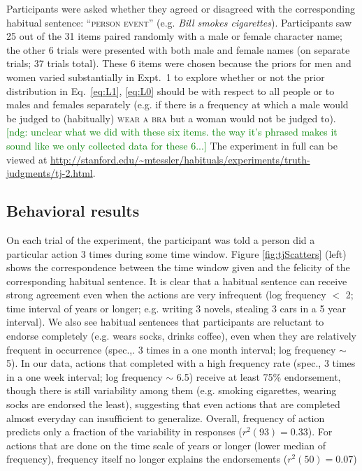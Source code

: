 \documentclass[10pt,letterpaper]{article}
\newcommand{\ndg}[1]{\textcolor{Green}{[ndg: #1]}}
\begin{document}
Participants were asked whether they agreed or disagreed with the corresponding habitual sentence: ``\textsc{person event}'' (e.g. \emph{Bill smokes cigarettes}).
Participants saw 25 out of the 31 items paired randomly with a male or female character name; the other 6 trials were presented with both male and female names (on separate trials; 37 trials total).  
These 6 items were chosen because the priors for men and women varied substantially in Expt.~1 to explore whether or not the prior distribution in Eq.~\ref{eq:L1}, \ref{eq:L0} should be with respect to all people or to males and females separately (e.g. if there is a frequency at which a male would be judged to (habitually) \textsc{wear a bra} but a woman would not be judged to). 
\ndg{unclear what we did with these six items. the way it's phrased makes it sound like we only collected data for these 6...}
The experiment in full can be viewed at \url{http://stanford.edu/~mtessler/habituals/experiments/truth-judgments/tj-2.html}.



\subsection{Behavioral results}

On each trial of the experiment, the participant was told a person did a particular action 3 times during some time window. 
Figure \ref{fig:tjScatters} (left) shows the correspondence between the time window given and the felicity of the corresponding habitual sentence. 
It is clear that a habitual sentence can receive strong agreement even when the actions are very infrequent (log frequency $<$ 2; time interval of years or longer; e.g. writing 3 novels, stealing 3 cars in a 5 year interval).
We also see habitual sentences that participants are reluctant to endorse completely (e.g. wears socks, drinks coffee), even when they are relatively frequent in occurrence (spec.,. 3 times in a one month interval; log frequency $\sim$ 5).
In our data, actions that completed with a high frequency rate (spec., 3 times in a one week interval; log frequency $\sim$ 6.5) receive at least 75\% endorsement, though there is still variability among them (e.g. smoking cigarettes, wearing socks are endorsed the least), suggesting that even actions that are completed almost everyday can insufficient to generalize.
Overall, frequency of action predicts only a fraction of the variability in responses ($r^2(93) = 0.33$).
For actions that are done on the time scale of years or longer (lower median of frequency), frequency itself no longer explains the endorsements ($r^2(50) = 0.07$)
\end{document}
